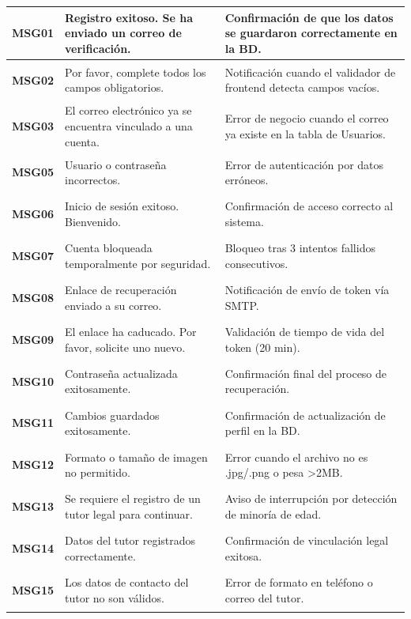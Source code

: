 \begin{longtable}{|p{2cm}|p{6cm}|p{6cm}|}
    \hypertarget{msg:MSG01}{\textbf{MSG01}} & Registro exitoso. Se ha enviado un correo de verificación. & Confirmación de que los datos se guardaron correctamente en la BD. \\ \hline
    \hypertarget{msg:MSG02}{\textbf{MSG02}} & Por favor, complete todos los campos obligatorios. & Notificación cuando el validador de frontend detecta campos vacíos. \\ \hline
    \hypertarget{msg:MSG03}{\textbf{MSG03}} & El correo electrónico ya se encuentra vinculado a una cuenta. & Error de negocio cuando el correo ya existe en la tabla de Usuarios. \\ \hline
    \hypertarget{msg:MSG05}{\textbf{MSG05}} & Usuario o contraseña incorrectos. & Error de autenticación por datos erróneos. \\ \hline
    \hypertarget{msg:MSG06}{\textbf{MSG06}} & Inicio de sesión exitoso. Bienvenido. & Confirmación de acceso correcto al sistema. \\ \hline
    \hypertarget{msg:MSG07}{\textbf{MSG07}} & Cuenta bloqueada temporalmente por seguridad. & Bloqueo tras 3 intentos fallidos consecutivos. \\ \hline
    \hypertarget{msg:MSG08}{\textbf{MSG08}} & Enlace de recuperación enviado a su correo. & Notificación de envío de token vía SMTP. \\ \hline
    \hypertarget{msg:MSG09}{\textbf{MSG09}} & El enlace ha caducado. Por favor, solicite uno nuevo. & Validación de tiempo de vida del token (20 min). \\ \hline
    \hypertarget{msg:MSG10}{\textbf{MSG10}} & Contraseña actualizada exitosamente. & Confirmación final del proceso de recuperación. \\ \hline
    \hypertarget{msg:MSG11}{\textbf{MSG11}} & Cambios guardados exitosamente. & Confirmación de actualización de perfil en la BD. \\ \hline
    \hypertarget{msg:MSG12}{\textbf{MSG12}} & Formato o tamaño de imagen no permitido. & Error cuando el archivo no es .jpg/.png o pesa >2MB. \\ \hline
    \hypertarget{msg:MSG13}{\textbf{MSG13}} & Se requiere el registro de un tutor legal para continuar. & Aviso de interrupción por detección de minoría de edad. \\ \hline
    \hypertarget{msg:MSG14}{\textbf{MSG14}} & Datos del tutor registrados correctamente. & Confirmación de vinculación legal exitosa. \\ \hline
    \hypertarget{msg:MSG15}{\textbf{MSG15}} & Los datos de contacto del tutor no son válidos. & Error de formato en teléfono o correo del tutor. \\ \hline

\end{longtable}
